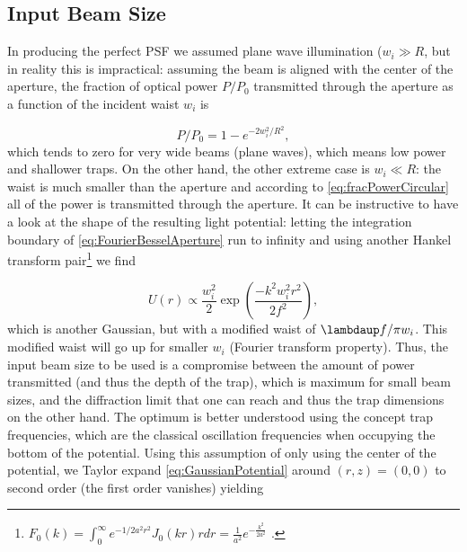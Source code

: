 \subsection{Input Beam Size}\label{sec:TweezersPractice}

In producing the perfect \ac{PSF} we assumed plane wave illumination ($w_i \gg R$, but in reality this is impractical: assuming the beam is aligned with the center of the aperture, the fraction of optical power $P/P_0$ transmitted through the aperture as a function of the incident waist $w_i$ is

\begin{equation}\label{eq:fracPowerCircular}
	P/P_0 = 1 - e^{-2w_i^2/R^2},
\end{equation}
which tends to zero for very wide beams (plane waves), which means low power and shallower traps.
On the other hand, the other extreme case is $w_i \ll R$: the waist is much smaller than the aperture and according to \cref{eq:fracPowerCircular} all of the power is transmitted through the aperture.
It can be instructive to have a look at the shape of the resulting light potential: letting the integration boundary of \cref{eq:FourierBesselAperture} run to infinity and using another Hankel transform pair\footnote{$F_0(k) = \int_0^{\infty} e^{-1/2 a^2 r^2} J_0(k r)r dr = \frac{1}{a^2} e^{-\frac{k^2}{2a^2}}$ \cite{Papoulis2981}.} we find 

\begin{equation}\label{eq:GaussianCase}
	U(r) \propto \frac{w_i^2}{2} \exp{\left(\frac{-k^2w_i^2 r^2}{2f^2}\right)},
\end{equation}
which is another Gaussian, but with a modified waist of $\lambdaup f / \pi w_i$.
This modified waist will go up for smaller $w_i$ (Fourier transform property). 
Thus, the input beam size to be used is a compromise between the amount of power transmitted (and thus the depth of the trap), which is maximum for small beam sizes, and the diffraction limit that one can reach and thus the trap dimensions on the other hand. 
The optimum is better understood using the concept trap frequencies, which are the classical oscillation frequencies when occupying the bottom of the potential. 
Using this assumption of only using the center of the potential, we Taylor expand \cref{eq:GaussianPotential} around $(r,z)=(0,0)$ to second order (the first order vanishes) yielding \cite{Muldoon2012}

